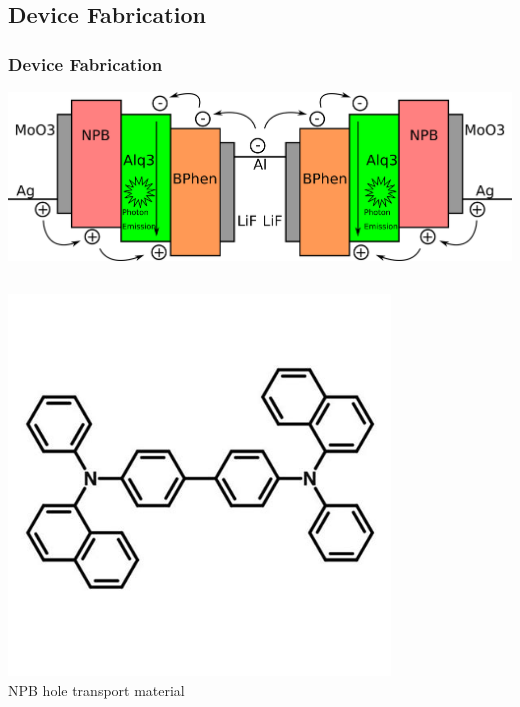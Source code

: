 \documentclass{beamer}
\begin{document}
    \subsection{Device Fabrication}
		\begin{frame}
			\frametitle{Device Fabrication}
			\centering
			\includegraphics[width=\textwidth]{images/microcavity_band_diagram.png}
			\vspace{0.5cm}
			\begin{columns}
				\begin{column}{0.3\textwidth}
					\centering
					\includegraphics[width=0.8\textwidth]{images/npb_structure.jpg}\\
					\tiny NPB hole transport material
				\end{column}
				\begin{column}{0.3\textwidth}
					\centering

\end{column}
\end{columns}
\end{frame}
\end{document}
